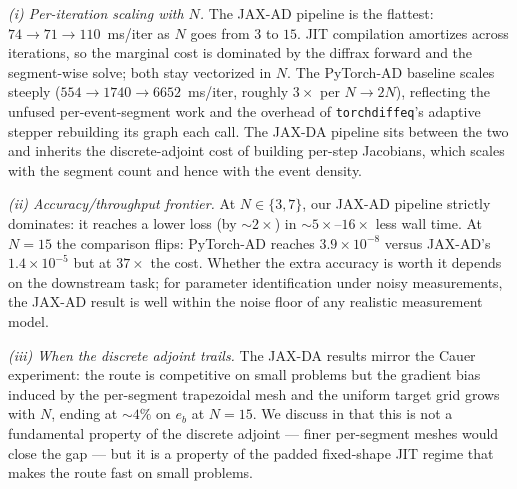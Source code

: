 \emph{(i) Per-iteration scaling with $N$.} The JAX-AD pipeline is the
flattest: $74 \!\to\! 71 \!\to\! 110$~ms/iter as $N$ goes from $3$ to
$15$. JIT compilation amortizes across iterations, so the marginal
cost is dominated by the diffrax forward and the segment-wise solve;
both stay vectorized in $N$. The PyTorch-AD baseline scales steeply
($554 \!\to\! 1740 \!\to\! 6652$~ms/iter, roughly $3\times$ per
$N\!\to\!2N$), reflecting the unfused per-event-segment work and the
overhead of \texttt{torchdiffeq}'s adaptive stepper rebuilding its
graph each call. The JAX-DA pipeline sits between the two and
inherits the discrete-adjoint cost of building per-step Jacobians,
which scales with the segment count and hence with the event density.

\emph{(ii) Accuracy/throughput frontier.} At $N\!\in\!\{3,7\}$, our
JAX-AD pipeline strictly dominates: it reaches a lower loss (by
$\sim\!2\!\times$) in $\sim\!5\!\times\text{--}16\!\times$ less wall
time. At $N=15$ the comparison flips: PyTorch-AD reaches
$3.9\!\times\!10^{-8}$ versus JAX-AD's $1.4\!\times\!10^{-5}$ but at
$37\!\times$ the cost. Whether the extra accuracy is worth it depends
on the downstream task; for parameter identification under noisy
measurements, the JAX-AD result is well within the noise floor of any
realistic measurement model.

\emph{(iii) When the discrete adjoint trails.} The JAX-DA results
mirror the Cauer experiment: the route is competitive on small
problems but the gradient bias induced by the per-segment
trapezoidal mesh and the uniform target grid grows with $N$, ending
at $\sim\!4\%$ on $e_b$ at $N=15$. We discuss in
 that this is not a fundamental property of
the discrete adjoint --- finer per-segment meshes would close the
gap --- but it is a property of the padded fixed-shape JIT regime
that makes the route fast on small problems.

